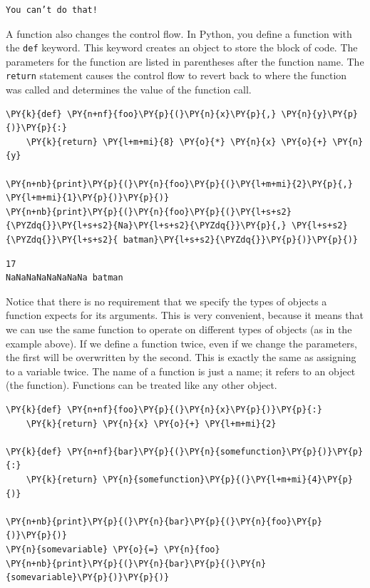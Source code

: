 \begin{Verbatim}
You can’t do that!
\end{Verbatim}


A function also changes the control flow.  In Python, you define a function with the \texttt{def} keyword.  This keyword creates an object to store the block of code.  The parameters for the function are listed in parentheses after the function name.  The \texttt{return} statement causes the control flow to revert back to where the function was called and determines the value of the function call.  


\begin{Verbatim}[commandchars=\\\{\}]
\PY{k}{def} \PY{n+nf}{foo}\PY{p}{(}\PY{n}{x}\PY{p}{,} \PY{n}{y}\PY{p}{)}\PY{p}{:}
    \PY{k}{return} \PY{l+m+mi}{8} \PY{o}{*} \PY{n}{x} \PY{o}{+} \PY{n}{y}

\PY{n+nb}{print}\PY{p}{(}\PY{n}{foo}\PY{p}{(}\PY{l+m+mi}{2}\PY{p}{,} \PY{l+m+mi}{1}\PY{p}{)}\PY{p}{)}
\PY{n+nb}{print}\PY{p}{(}\PY{n}{foo}\PY{p}{(}\PY{l+s+s2}{\PYZdq{}}\PY{l+s+s2}{Na}\PY{l+s+s2}{\PYZdq{}}\PY{p}{,} \PY{l+s+s2}{\PYZdq{}}\PY{l+s+s2}{ batman}\PY{l+s+s2}{\PYZdq{}}\PY{p}{)}\PY{p}{)}
\end{Verbatim}

\begin{Verbatim}
17
NaNaNaNaNaNaNaNa batman
\end{Verbatim}


Notice that there is no requirement that we specify the types of objects a function expects for its arguments.  This is very convenient, because it means that we can use the same function to operate on different types of objects (as in the example above).  If we define a function twice, even if we change the parameters, the first will be overwritten by the second.  This is exactly the same as assigning to a variable twice.  The name of a function is just a name; it refers to an object (the function).  Functions can be treated like any other object.


\begin{Verbatim}[commandchars=\\\{\}]
\PY{k}{def} \PY{n+nf}{foo}\PY{p}{(}\PY{n}{x}\PY{p}{)}\PY{p}{:}
    \PY{k}{return} \PY{n}{x} \PY{o}{+} \PY{l+m+mi}{2}

\PY{k}{def} \PY{n+nf}{bar}\PY{p}{(}\PY{n}{somefunction}\PY{p}{)}\PY{p}{:}
    \PY{k}{return} \PY{n}{somefunction}\PY{p}{(}\PY{l+m+mi}{4}\PY{p}{)}

\PY{n+nb}{print}\PY{p}{(}\PY{n}{bar}\PY{p}{(}\PY{n}{foo}\PY{p}{)}\PY{p}{)}
\PY{n}{somevariable} \PY{o}{=} \PY{n}{foo}
\PY{n+nb}{print}\PY{p}{(}\PY{n}{bar}\PY{p}{(}\PY{n}{somevariable}\PY{p}{)}\PY{p}{)}
\end{Verbatim}

